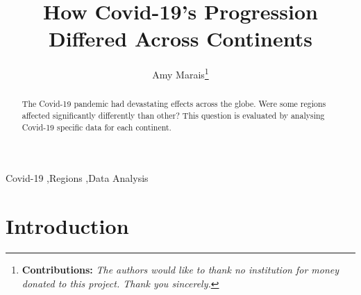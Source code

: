 \documentclass[11pt,preprint, authoryear]{elsarticle}
\numberwithin{equation}{section}
\numberwithin{figure}{section}
\numberwithin{table}{section}
\let\rmarkdownfootnote\footnote%
\def\footnote{\protect\rmarkdownfootnote}
\begin{document}
\begin{frontmatter}  %

\title{How Covid-19's Progression Differed Across Continents}





\author[Add1]{Amy Marais\footnote{\textbf{Contributions:}
  \newline \emph{The authors would like to thank no institution for
  money donated to this project. Thank you sincerely.}}}





\address[Add1]{Stellenbosch University, South Africa}


\begin{abstract}
\small{
The Covid-19 pandemic had devastating effects across the globe. Were
some regions affected significantly differently than other? This
question is evaluated by analysing Covid-19 specific data for each
continent.
}
\end{abstract}

\vspace{1cm}


\begin{keyword}
\footnotesize{
Covid-19 \sep Regions \sep Data Analysis \\
\vspace{0.3cm}
}
\end{keyword}



\vspace{0.5cm}

\end{frontmatter}

\setcounter{footnote}{0}



\pagestyle{fancy}
\chead{}
\rhead{}
\lfoot{}
\lhead{}
\cfoot{}


\headsep 35pt %




\hypertarget{introduction}{%
\section*{\texorpdfstring{Introduction
\label{Introduction}}{Introduction }}\label{introduction}}
\end{document}
